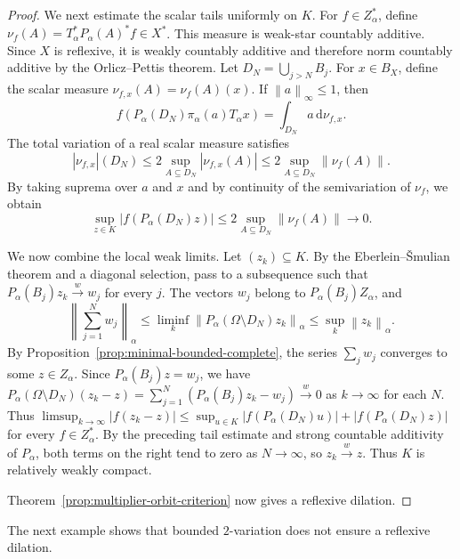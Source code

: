 \documentclass[11pt,leqno]{amsart}
\theoremstyle{compact}
\numberwithin{equation}{section}
\theoremstyle{compactremark}
\theoremstyle{compact}
\newcommand{\1}{\mathbbm{1}}
\newcommand{\rmd}{\mathrm{d}}
\newcommand{\norm}[1]{\left\|#1\right\|}
\newcommand{\abs}[1]{\left|#1\right|}
\begin{document}
\begin{proof}
We next estimate the scalar tails uniformly on $K$. For $f\in Z_\alpha^*$, define $\nu_f(A)=T_\alpha^*P_\alpha(A)^*f\in X^*$. This measure is weak-star countably additive. Since $X$ is reflexive, it is weakly countably additive and therefore norm countably additive by the Orlicz--Pettis theorem. Let $D_N=\bigcup_{j>N}B_j$.
\begingroup
For $x\in B_X$, define the scalar measure $\nu_{f,x}(A)=\nu_f(A)(x)$. If $\norm{a}_\infty\leq1$, then
\[
f(P_\alpha(D_N)\pi_\alpha(a)T_\alpha x)=\int_{D_N}a\,\rmd\nu_{f,x}.
\]
The total variation of a real scalar measure satisfies
\[
\abs{\nu_{f,x}}(D_N)\leq2\sup_{A\subseteq D_N}\abs{\nu_{f,x}(A)}\leq2\sup_{A\subseteq D_N}\norm{\nu_f(A)}.
\]
By taking suprema over $a$ and $x$ and by continuity of the semivariation of $\nu_f$, we obtain
\begingroup
\[
\sup_{z\in K}\abs{f(P_\alpha(D_N)z)}
\leq2\sup_{A\subseteq D_N}\norm{\nu_f(A)}
\longrightarrow0.
\]
\endgroup
\endgroup

We now combine the local weak limits. Let $(z_k)\subseteq K$. By the Eberlein--\v Smulian theorem and a diagonal selection, pass to a subsequence such that $P_\alpha(B_j)z_k\xrightarrow{w} w_j$ for every $j$. The vectors $w_j$ belong to $P_\alpha(B_j)Z_\alpha$, and
\[
\norm{\sum_{j=1}^Nw_j}_\alpha
\leq\liminf_k\norm{P_\alpha(\Omega\setminus D_N)z_k}_\alpha
\leq\sup_k\norm{z_k}_\alpha.
\]
By Proposition~\ref{prop:minimal-bounded-complete}, the series $\sum_jw_j$ converges to some $z\in Z_\alpha$. Since $P_\alpha(B_j)z=w_j$, we have $P_\alpha(\Omega\setminus D_N)(z_k-z)=\sum_{j=1}^N(P_\alpha(B_j)z_k-w_j)\xrightarrow{w}0$ as $k\to\infty$ for each $N$. Thus $\limsup_{k\to\infty}\abs{f(z_k-z)}\leq\sup_{u\in K}\abs{f(P_\alpha(D_N)u)}+\abs{f(P_\alpha(D_N)z)}$ for every $f\in Z_\alpha^*$. By the preceding tail estimate and strong countable additivity of $P_\alpha$, both terms on the right tend to zero as $N\to\infty$, so $z_k\xrightarrow{w}z$. Thus $K$ is relatively weakly compact.

Theorem~\ref{prop:multiplier-orbit-criterion} now gives a reflexive dilation.
\end{proof}

The next example shows that bounded $2$-variation does not ensure a reflexive dilation.
\end{document}
